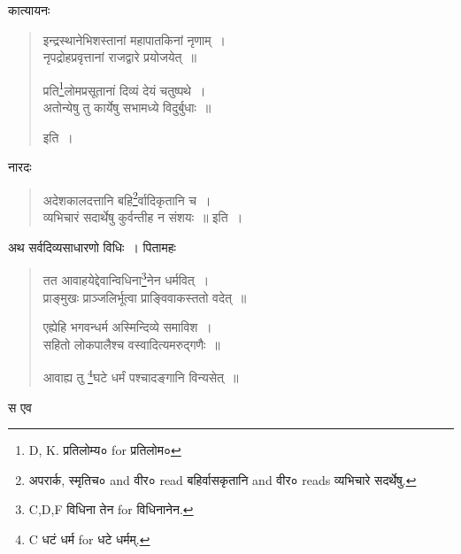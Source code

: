 \documentclass[11pt, openany]{book}
\begin{document}
कात्यायनः

\begin{quote}
{\vy इन्द्रस्थानेभिशस्तानां महापातकिनां नृणाम्~।\\
नृपद्रोहप्रवृत्तानां राजद्वारे प्रयोजयेत्~॥

प्रति\renewcommand{\thefootnote}{3}\footnote{D, K. प्रतिलोम्य० for प्रतिलोम०}लोमप्रसूतानां दिव्यं देयं चतुष्पथे~।\\
अतोन्येषु तु कार्येषु सभामध्ये विदुर्बुधाः~॥} इति~।
\end{quote}

नारदः

\begin{quote}
{\vy अदेशकालदत्तानि बहि\renewcommand{\thefootnote}{4}\footnote{अपरार्क, स्मृतिच० and वीर० read बहिर्वासकृतानि and वीर० reads व्यभिचारे सदर्थेषु.}र्वादिकृतानि च~।\\
व्यभिचारं सदार्थेषु कुर्वन्तीह न संशयः~॥} इति~।
\end{quote}

\newpage
{}

अथ सर्वदिव्यसाधारणो विधिः~। पितामहः 

\begin{quote}
{\vy तत आवाहयेद्देवान्विधिना\renewcommand{\thefootnote}{1}\footnote{C,D,F विधिना तेन for विधिनानेन.}नेन धर्मवित्~।\\
प्राङ्मुखः प्राञ्जलिर्भूत्वा प्राङ्विवाकस्ततो वदेत्~॥

एह्येहि भगवन्धर्म अस्मिन्दिव्ये समाविश~।\\
सहितो लोकपालैश्च वस्वादित्यमरुद्गणैः~॥

आवाह्य तु \renewcommand{\thefootnote}{2}\footnote{C धटं धर्म for धटे धर्मम्.}घटे धर्मं पश्चादङ्गानि विन्यसेत्~॥}
\end{quote}

स एव
\end{document}
